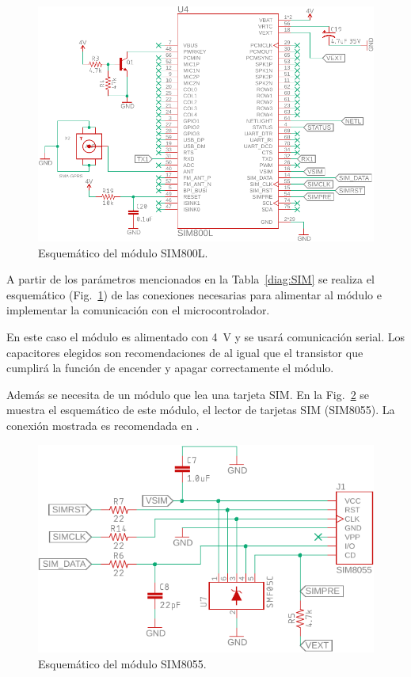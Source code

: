\begin{figure}[htbp!]
\centering
\includegraphics[width=\textwidth]{GSM_esquem.pdf}
\caption{Esquemático del módulo SIM800L.}
\label{fig:GSM_esquem}
\end{figure}

A partir de los parámetros mencionados en la Tabla~\ref{diag:SIM} se realiza el esquemático (Fig.~\ref{fig:GSM_esquem}) de las conexiones necesarias para alimentar al módulo e implementar la comunicación con el microcontrolador.



En este caso el módulo es alimentado con \SI{4}{V} y se usará comunicación serial. Los capacitores elegidos son recomendaciones de \cite{SIM800L} al igual que el transistor que cumplirá la función de encender y apagar correctamente el módulo.


Además se necesita de un módulo que lea una tarjeta SIM. En la Fig.~\ref{fig:GSM_SIM_esquem} se muestra el esquemático de este módulo, el lector de tarjetas SIM (SIM8055). La conexión mostrada es recomendada en \cite{SIM800L}.

\begin{figure}[htbp!]
\centering
\includegraphics[width=\textwidth]{GSM_SIM_esquem.pdf}
\caption{Esquemático del módulo SIM8055.}
\label{fig:GSM_SIM_esquem}
\end{figure}

